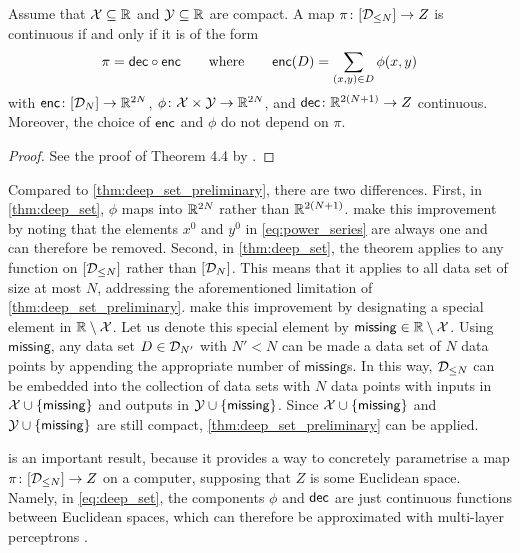\documentclass[12pt, twoside]{report}
\begin{document}
\begin{theorem} \label{thm:deep_set}
    Assume that $\X \sub \R$ and $\Y \sub \R$ are compact.
    A map $\pi \colon [\D_{\le N}] \to Z$ is continuous if and only if it is of the form
    \begin{equation} \label{eq:deep_set}
        \pi = \dec \comp \enc \qquad \text{where} \qquad \enc(D) = \sum_{\smash{(x, y) \in D}} \phi(x, y)
    \end{equation}
    with $\enc \colon [\D_N] \to \smash{\R^{2N}}$,
    $\phi\colon \X \times \Y \to \smash{\R^{2N}}$, and
    $\dec \colon \smash{\R^{2(N+1)}} \to Z$ continuous.
    Moreover, the choice of $\enc$ and $\phi$ do not depend on $\pi$.
\end{theorem}
\begin{proof}
    See the proof of Theorem 4.4 by \textcite{Wagstaff:2019:On_the_Limitations_of_Representing}.
\end{proof}

Compared to \cref{thm:deep_set_preliminary}, there are two differences.
First, in \cref{thm:deep_set}, $\phi$ maps into $\R^{2N}$ rather than $\R^{2(N+1)}$.
\citeauthor{Wagstaff:2019:On_the_Limitations_of_Representing} make this improvement by noting that the elements $x^0$ and $y^0$ in \eqref{eq:power_series} are always one and can therefore be removed.
Second, in \cref{thm:deep_set}, the theorem applies to any function on $[\D_{\le N}]$ rather than $[\D_{N}]$.
This means that it applies to all data set of size at most $N$, addressing the aforementioned limitation of \cref{thm:deep_set_preliminary}.
\citeauthor{Wagstaff:2019:On_the_Limitations_of_Representing} make this improvement by designating a special element in $\R \setminus \X$.
Let us denote this special element by $\mathsf{missing} \in \R \setminus \X$.
Using $\mathsf{missing}$, any data set $D \in \D_{N'}$ with $N' < N$ can be made a data set of $N$ data points by appending the appropriate number of $\mathsf{missing}$s.
In this way, $\D_{\le N}$ can be embedded into the collection of data sets with $N$ data points with inputs in
$\X \cup \set{\mathsf{missing}}$ and outputs in $\Y \cup \set{\mathsf{missing}}$.
Since $\X \cup \set{\mathsf{missing}}$ and $\Y \cup \set{\mathsf{missing}}$ are still compact, \cref{thm:deep_set_preliminary} can be applied.

 is an important result, because it provides a way to concretely parametrise a map $\pi\colon[\D_{\le N}] \to Z$ on a computer, supposing that $Z$ is some Euclidean space. 
Namely, in \eqref{eq:deep_set}, the components $\phi$ and $\dec$ are just continuous functions between Euclidean spaces, which can therefore be approximated with multi-layer perceptrons \parencite{Cybenko:1989:Approximation_by_Superpositions_of_a}.
\end{document}
